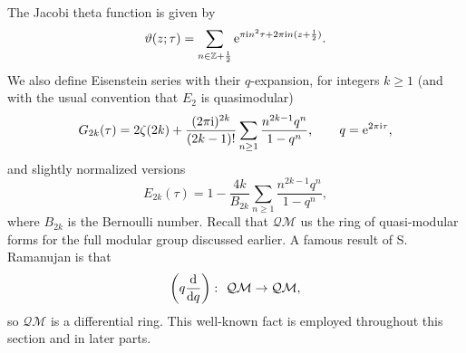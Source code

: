 \documentclass[pdftex]{sigma}
\numberwithin{equation}{section}
\theoremstyle{definition}
\begin{document}
The Jacobi theta function is given by
\[
\vartheta(z;\tau)=\sum_{n \in \mathbb{Z}+\frac12} {\rm e}^{\pi {\rm i} n^2 \tau+2 \pi {\rm i} n(z+\frac12)}.
\]
We also define Eisenstein series with their $q$-expansion, for integers $k\geq1$ (and with the usual convention that $E_2$ is quasimodular)
\[
G_{2k}(\tau)=2 \zeta(2k)+\frac{(2\pi {\rm i})^{2k}}{(2k-1)!} \sum_{n \geq 1} \frac{n^{2k-1}q^n}{1-q^n}, \qquad q={\rm e}^{2 \pi {\rm i} \tau},
\]
and slightly normalized versions
\begin{equation} \label{eis}
E_{2k}(\tau)=1-\frac{4k}{B_{2k}}\sum_{n \geq 1} \frac{n^{2k-1} q^n}{1-q^n},
\end{equation}
where $B_{2k}$ is the Bernoulli number. Recall that $\mathcal{QM}$ us the ring of quasi-modular forms for the full modular group discussed earlier. A famous result of S. Ramanujan is that
\[
\left(q \frac{{\rm d}}{{\rm d}q} \right)\colon \ \mathcal{QM} \rightarrow \mathcal{QM},
\]
so $\mathcal{QM}$ is a differential ring. This well-known fact is employed throughout this section and in later parts.
\end{document}

